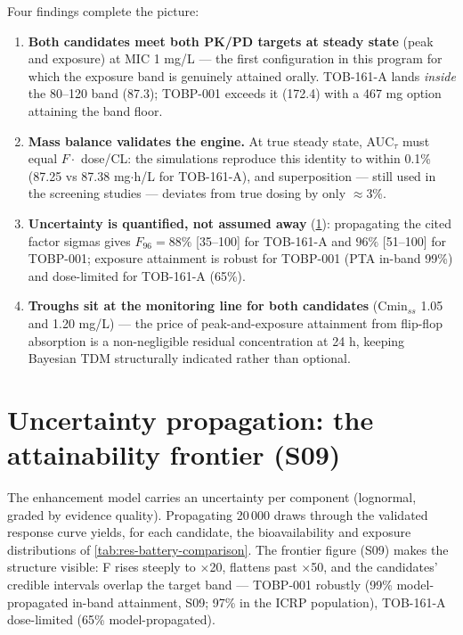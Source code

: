 Four findings complete the picture:

\begin{enumerate}
\item \textbf{Both candidates meet both PK/PD targets at steady state} (peak and exposure) at MIC 1 mg/L --- the first configuration in this program for which the exposure band is genuinely attained orally. TOB-161-A lands \emph{inside} the 80--120 band (87.3); TOBP-001 exceeds it (172.4) with a 467 mg option attaining the band floor.
\item \textbf{Mass balance validates the engine.} At true steady state, AUC$_{\tau}$ must equal $F \cdot$ dose/CL: the simulations reproduce this identity to within 0.1\% (87.25 vs 87.38 mg$\cdot$h/L for TOB-161-A), and superposition --- still used in the screening studies --- deviates from true dosing by only $\approx$3\%.
\item \textbf{Uncertainty is quantified, not assumed away} (\cref{sec:res-s09}): propagating the cited factor sigmas gives $F_{96} = 88\%$ [35--100] for TOB-161-A and $96\%$ [51--100] for TOBP-001; exposure attainment is robust for TOBP-001 (PTA in-band 99\%) and dose-limited for TOB-161-A (65\%).
\item \textbf{Troughs sit at the monitoring line for both candidates} (Cmin$_{ss}$ 1.05 and 1.20 mg/L) --- the price of peak-and-exposure attainment from flip-flop absorption is a non-negligible residual concentration at 24 h, keeping Bayesian TDM structurally indicated rather than optional.
\end{enumerate}

\section{Uncertainty propagation: the attainability frontier (S09)}
\label{sec:res-s09}

The enhancement model carries an uncertainty per component (lognormal, graded by evidence quality). Propagating 20\,000 draws through the validated response curve yields, for each candidate, the bioavailability and exposure distributions of \cref{tab:res-battery-comparison}. The frontier figure (S09) makes the structure visible: F rises steeply to $\times$20, flattens past $\times$50, and the candidates' credible intervals overlap the target band --- TOBP-001 robustly (99\% model-propagated in-band attainment, S09; 97\% in the ICRP population), TOB-161-A dose-limited (65\% model-propagated).

